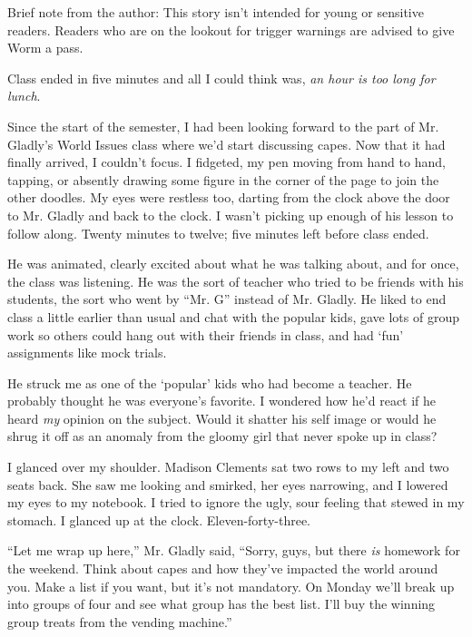 





Brief note from the author:  This story isn't intended for young or sensitive readers.  Readers who are on the lookout for trigger warnings are advised to give Worm a pass.



\blacksquare



Class ended in five minutes and all I could think was, \emph{an hour is too long for lunch}.



Since the start of the semester, I had been looking forward to the part of Mr. Gladly's World Issues class where we'd start discussing capes.  Now that it had finally arrived, I couldn't focus.  I fidgeted, my pen moving from hand to hand, tapping, or absently drawing some figure in the corner of the page to join the other doodles.  My eyes were restless too, darting from the clock above the door to Mr. Gladly and back to the clock.  I wasn't picking up enough of his lesson to follow along.  Twenty minutes to twelve; five minutes left before class ended.



He was animated, clearly excited about what he was talking about, and for once, the class was listening.  He was the sort of teacher who tried to be friends with his students, the sort who went by ``Mr. G'' instead of Mr. Gladly.  He liked to end class a little earlier than usual and chat with the popular kids, gave lots of group work so others could hang out with their friends in class, and had `fun' assignments like mock trials.



He struck me as one of the `popular' kids who had become a teacher.  He probably thought he was everyone's favorite.  I wondered how he'd react if he heard \emph{my} opinion on the subject.  Would it shatter his self image or would he shrug it off as an anomaly from the gloomy girl that never spoke up in class?



I glanced over my shoulder.  Madison Clements sat two rows to my left and two seats back.  She saw me looking and smirked, her eyes narrowing, and I lowered my eyes to my notebook.  I tried to ignore the ugly, sour feeling that stewed in my stomach.  I glanced up at the clock.  Eleven-forty-three.



``Let me wrap up here,'' Mr. Gladly said, ``Sorry, guys, but there \emph{is} homework for the weekend.  Think about capes and how they've impacted the world around you.  Make a list if you want, but it's not mandatory.  On Monday we'll break up into groups of four and see what group has the best list.  I'll buy the winning group treats from the vending machine.''



